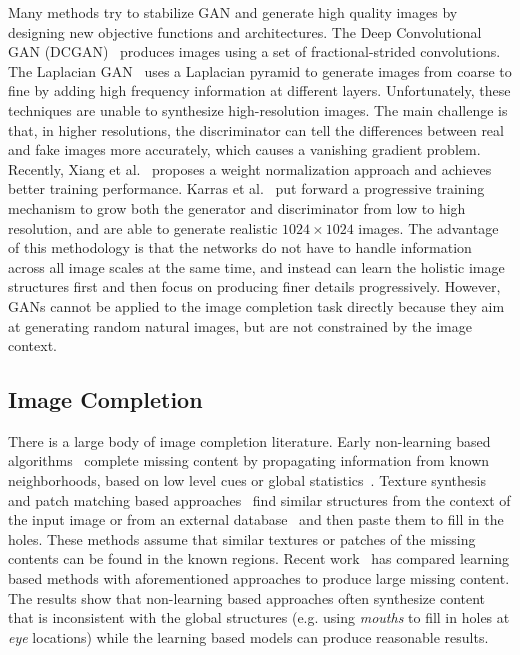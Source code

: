 \documentclass[acmtog,timestamp]{acmart}
\begin{document}
Many methods try to stabilize GAN and generate high quality images by designing new objective functions and architectures. The Deep Convolutional GAN (DCGAN)~\cite{radford2015unsupervised} produces images using a set of fractional-strided convolutions. The Laplacian GAN~\cite{denton2015deep} uses a Laplacian pyramid to generate images from coarse to fine by adding high frequency information at different layers. Unfortunately, these techniques are unable to synthesize high-resolution images. The main challenge is that, in higher resolutions, the discriminator can tell the differences between real and fake images more accurately, which causes a vanishing gradient problem. Recently, Xiang et al.~\cite{xiang2017effects} proposes a weight normalization approach and achieves better training performance. Karras et al.~\cite{karras2017progressive} put forward a progressive training mechanism to grow both the generator and discriminator from low to high resolution, and are able to generate realistic $1024\times1024$ images. The advantage of this methodology is that the networks do not have to handle information across all image scales at the same time, and instead can learn the holistic image structures first and then focus on producing finer details progressively. However, GANs cannot be applied to the image completion task directly because they aim at generating random natural images, but are not constrained by the image context.

\subsection{Image Completion}
There is a large body of image completion literature. Early non-learning based algorithms~\cite{efros1999texture,bertalmio2000image,bertalmio2003simultaneous} complete missing content by propagating information from known neighborhoods, based on low level cues or global statistics~\cite{levin2003learning}. Texture synthesis and patch matching based approaches~\cite{efros1999texture,kwatra2003graphcut,criminisi2003object,wilczkowiak2005hole,komodakis2006image,barnes2009patchmatch,darabi2012image,huang2014image,wexler2007space} find similar structures from the context of the input image or from an external database~\cite{hays2007scene} and then paste them to fill in the holes. These methods assume that similar textures or patches of the missing contents can be found in the known regions. Recent work~\cite{pathak2016context,iizuka2017globally,yeh2017semantic} has compared learning based methods with aforementioned approaches to produce large missing content. The results show that non-learning based approaches often synthesize content that is inconsistent with the global structures (e.g. using \textit{mouths} to fill in holes at \textit{eye} locations) while the learning based models can produce reasonable results. 
\end{document}
